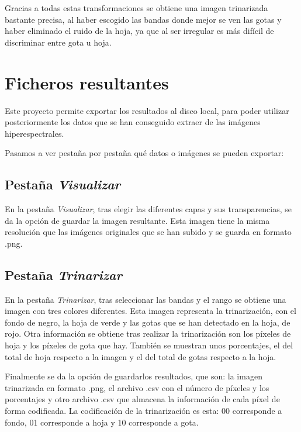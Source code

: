 Gracias a todas estas transformaciones se obtiene una imagen trinarizada bastante precisa, al haber escogido las bandas donde mejor se ven las gotas y haber eliminado el ruido de la hoja, ya que al ser irregular es más difícil de discriminar entre gota u hoja.

\section{Ficheros resultantes}
Este proyecto permite exportar los resultados al disco local, para poder utilizar posteriormente los datos que se han conseguido extraer de las imágenes hiperespectrales.


Pasamos a ver pestaña por pestaña qué datos o imágenes se pueden exportar:
 
\subsection{Pestaña \textit{Visualizar}}
En la pestaña \textit{Visualizar}, tras elegir las diferentes capas y sus transparencias, se da la opción de guardar la imagen resultante. Esta imagen tiene la misma resolución que las imágenes originales que se han subido y se guarda en formato .png.


\subsection{Pestaña \textit{Trinarizar}}
En la pestaña \textit{Trinarizar}, tras seleccionar las bandas y el rango se obtiene una imagen con tres colores diferentes. Esta imagen representa la trinarización, con el fondo de negro, la hoja de verde y las gotas que se han detectado en la hoja, de rojo. Otra información se obtiene tras realizar la trinarización son los píxeles de hoja y los píxeles de gota que hay. También se muestran unos porcentajes, el del total de hoja respecto a la imagen y el del total de gotas respecto a la hoja.


Finalmente se da la opción de guardarlos resultados, que son: la imagen trinarizada en formato .png, el archivo .csv con el número de píxeles y los porcentajes y otro archivo .csv que almacena la información de cada píxel de forma codificada. La codificación de la trinarización es esta: 00 corresponde a fondo, 01 corresponde a hoja y 10 corresponde a gota.

